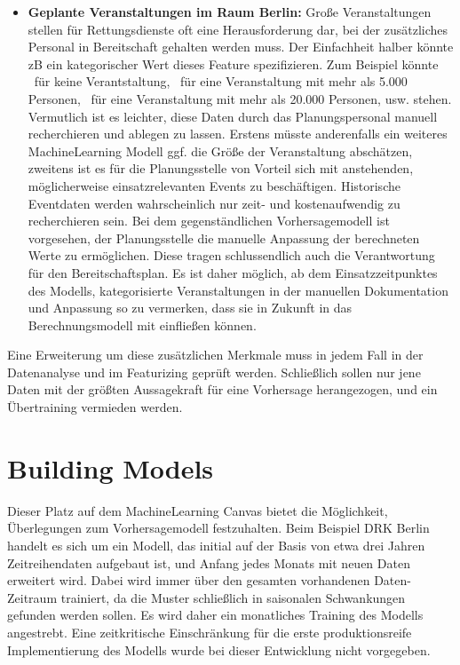 \begin{itemize}
 \item \textbf{Geplante Veranstaltungen im Raum Berlin:} Große Veranstaltungen stellen für Rettungsdienste oft eine Herausforderung dar, bei der zusätzliches Personal in Bereitschaft gehalten werden muss. Der Einfachheit halber könnte zB ein kategorischer Wert dieses Feature spezifizieren. Zum Beispiel könnte \grqq\ für keine Verantstaltung, \grqq\ für eine Veranstaltung mit mehr als 5.000 Personen, \grqq\ für eine Veranstaltung mit mehr als 20.000 Personen, usw. stehen. Vermutlich ist es leichter, diese Daten durch das Planungspersonal manuell recherchieren und ablegen zu lassen. Erstens müsste anderenfalls ein weiteres MachineLearning Modell ggf. die Größe der Veranstaltung abschätzen, zweitens ist es für die Planungsstelle von Vorteil sich mit anstehenden, möglicherweise einsatzrelevanten Events zu beschäftigen. Historische Eventdaten werden wahrscheinlich nur zeit- und kostenaufwendig zu recherchieren sein. Bei dem gegenständlichen Vorhersagemodell ist vorgesehen, der Planungsstelle die manuelle Anpassung der berechneten Werte zu ermöglichen. Diese tragen schlussendlich auch die Verantwortung für den Bereitschaftsplan. Es ist daher möglich, ab dem Einsatzzeitpunktes des Modells, kategorisierte Veranstaltungen in der manuellen Dokumentation und Anpassung so zu vermerken, dass sie in Zukunft in das Berechnungsmodell mit einfließen können.
\end{itemize} 

Eine Erweiterung um diese zusätzlichen Merkmale muss in jedem Fall in der Datenanalyse und im Featurizing geprüft werden. Schließlich sollen nur jene Daten mit der größten Aussagekraft für eine Vorhersage herangezogen, und ein Übertraining vermieden werden.



\section{Building Models}
\label{building}
Dieser Platz auf dem MachineLearning Canvas bietet die Möglichkeit, Überlegungen zum Vorhersagemodell festzuhalten. Beim Beispiel DRK Berlin handelt es sich um ein Modell, das initial auf der Basis von etwa drei Jahren Zeitreihendaten aufgebaut ist, und Anfang jedes Monats mit neuen Daten erweitert wird. Dabei wird immer über den gesamten vorhandenen Daten-Zeitraum trainiert, da die Muster schließlich in saisonalen Schwankungen gefunden werden sollen. Es wird daher ein monatliches Training des Modells angestrebt. Eine zeitkritische Einschränkung für die erste produktionsreife Implementierung des Modells wurde bei dieser Entwicklung nicht vorgegeben.

